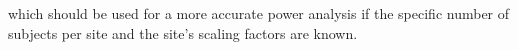 which should be used for a more accurate power analysis if the specific number of subjects per site and the site's scaling factors are known.
